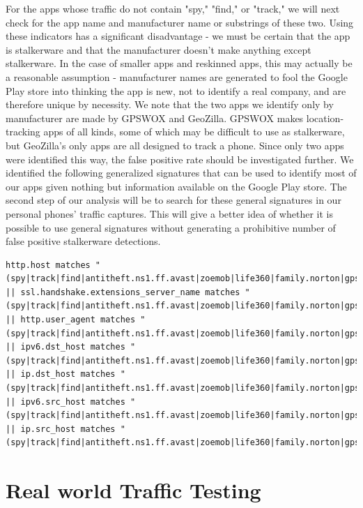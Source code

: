 \documentclass[acmtog]{acmart}
\begin{document}
For the apps whose traffic do not contain "spy," "find," or "track," we will 
next check for the app name and manufacturer name or substrings of these two. 
Using these indicators has a significant disadvantage - we must be certain that 
the app is stalkerware and that the manufacturer doesn't make anything except 
stalkerware. In the case of smaller apps and reskinned apps, this may actually 
be a reasonable assumption - manufacturer names are generated to fool the 
Google Play store into thinking the app is new, not to identify a real company, 
and are therefore unique by necessity. We note that the two apps we identify 
only by manufacturer are made by GPSWOX and GeoZilla. GPSWOX makes 
location-tracking apps of all kinds, some of which may be difficult to use as 
stalkerware, but GeoZilla's only apps are all designed to track a phone. Since 
only two apps were identified this way, the false positive rate should be 
investigated further.
We identified the following generalized signatures that can be used to identify 
most of our apps given nothing but information available on the Google Play 
store. The second step of our analysis will be to search for these general 
signatures in our personal phones' traffic captures. This will give a better 
idea of whether it is possible to use general signatures without generating a 
prohibitive number of false positive stalkerware detections.
\begin{lstlisting}
http.host matches "(spy|track|find|antitheft.ns1.ff.avast|zoemob|life360|family.norton|gpswox|geozilla)" 
|| ssl.handshake.extensions_server_name matches "(spy|track|find|antitheft.ns1.ff.avast|zoemob|life360|family.norton|gpswox|geozilla)" 
|| http.user_agent matches "(spy|track|find|antitheft.ns1.ff.avast|zoemob|life360|family.norton|gpswox|geozilla)" 
|| ipv6.dst_host matches "(spy|track|find|antitheft.ns1.ff.avast|zoemob|life360|family.norton|gpswox|geozilla)"
|| ip.dst_host matches "(spy|track|find|antitheft.ns1.ff.avast|zoemob|life360|family.norton|gpswox|geozilla)"  
|| ipv6.src_host matches "(spy|track|find|antitheft.ns1.ff.avast|zoemob|life360|family.norton|gpswox|geozilla)"
|| ip.src_host matches "(spy|track|find|antitheft.ns1.ff.avast|zoemob|life360|family.norton|gpswox|geozilla)"
\end{lstlisting}


\section{Real world Traffic Testing}
\end{document}
